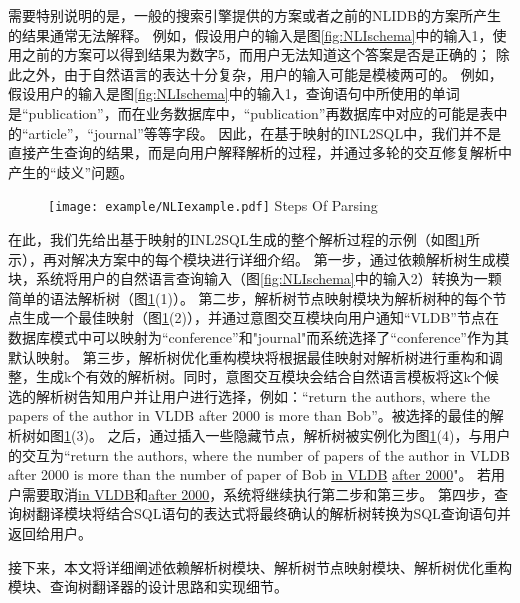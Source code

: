 需要特别说明的是，一般的搜索引擎提供的方案或者之前的NLIDB的方案所产生的结果通常无法解释。
例如，假设用户的输入是图\ref{fig:NLIschema}中的输入1，使用之前的方案可以得到结果为数字5，而用户无法知道这个答案是否是正确的；
除此之外，由于自然语言的表达十分复杂，用户的输入可能是模棱两可的。
例如，假设用户的输入是图\ref{fig:NLIschema}中的输入1，查询语句中所使用的单词是“publication”，而在业务数据库中，“publication”再数据库中对应的可能是表中的“article”，“journal”等等字段。
因此，在基于映射的INL2SQL中，我们并不是直接产生查询的结果，而是向用户解释解析的过程，并通过多轮的交互修复解析中产生的“歧义”问题。

\begin{figure}[!htp]
  \centering
  \texttt{[image: example/NLIexample.pdf]}
    {Steps Of Parsing}
  \label{fig:NLIexample}
\end{figure}

在此，我们先给出基于映射的INL2SQL生成的整个解析过程的示例（如图\ref{fig:NLIexample}所示），再对解决方案中的每个模块进行详细介绍。
第一步，通过依赖解析树生成模块，系统将用户的自然语言查询输入（图\ref{fig:NLIschema}中的输入2）转换为一颗简单的语法解析树（图\ref{fig:NLIexample}(1)）。
第二步，解析树节点映射模块为解析树种的每个节点生成一个最佳映射（图\ref{fig:NLIexample}(2)），并通过意图交互模块向用户通知“VLDB”节点在数据库模式中可以映射为“conference”和"journal"而系统选择了“conference”作为其默认映射。
第三步，解析树优化重构模块将根据最佳映射对解析树进行重构和调整，生成k个有效的解析树。同时，意图交互模块会结合自然语言模板将这k个候选的解析树告知用户并让用户进行选择，例如：“return the authors, where the papers of the author in VLDB after 2000 is more than Bob”。被选择的最佳的解析树如图\ref{fig:NLIexample}(3)。
之后，通过插入一些隐藏节点，解析树被实例化为图\ref{fig:NLIexample}(4)，与用户的交互为“return the authors, where the number of papers of the author in VLDB after 2000 is more than the number of paper of Bob \underline{in VLDB} \underline{after 2000}"。
若用户需要取消\underline{in VLDB}和\underline{after 2000}，系统将继续执行第二步和第三步。
第四步，查询树翻译模块将结合SQL语句的表达式将最终确认的解析树转换为SQL查询语句并返回给用户。

接下来，本文将详细阐述依赖解析树模块、解析树节点映射模块、解析树优化重构模块、查询树翻译器的设计思路和实现细节。



